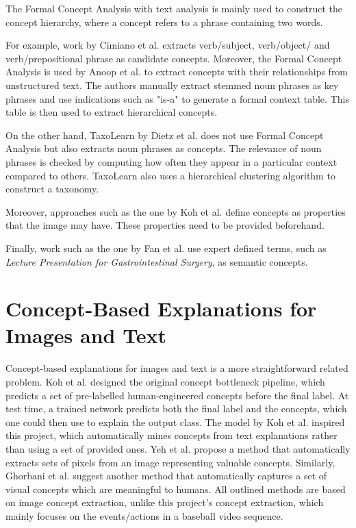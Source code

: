 The Formal Concept Analysis with text analysis is mainly used to construct the concept hierarchy, where a concept refers to a phrase containing two words.

For example, work by Cimiano et al. \cite{RefWorks:RefID:32-cimiano2005learning} extracts verb/subject, verb/object/ and verb/prepositional phrase as candidate concepts.
Moreover, the Formal Concept Analysis is used by Anoop et al. \cite{RefWorks:RefID:33-anoop2019extracting} to extract concepts with their relationships from unstructured text.
The authors manually extract stemmed noun phrases as key phrases and use indications such as "is-a" to generate a formal context table.
This table is then used to extract hierarchical concepts.

On the other hand, TaxoLearn \cite{RefWorks:RefID:34-dietz2012taxolearn} by Dietz et al. does not use Formal Concept Analysis but also extracts noun phrases as concepts. The relevance of noun phrases is checked by computing how often they appear in a particular context compared to others. TaxoLearn also uses a hierarchical clustering algorithm to construct a taxonomy.

Moreover, approaches such as the one by Koh et al. \cite{RefWorks:RefID:35-koh2020concept} define concepts as properties that the image may have. These properties need to be provided beforehand.

Finally, work such as the one by Fan et al. \cite{RefWorks:RefID:50-fan2004semantic} use expert defined terms, such as \emph{Lecture Presentation for Gastrointestinal Surgery}, as semantic concepts. 


\section{Concept-Based Explanations for Images and Text}

Concept-based explanations for images and text is a more straightforward related problem.
Koh et al. \cite{RefWorks:RefID:35-koh2020concept} designed the original concept bottleneck pipeline, which predicts a set of pre-labelled human-engineered concepts before the final label.
At test time, a trained network predicts both the final label and the concepts, which one could then use to explain the output class.
The model by Koh et al. inspired this project, which automatically mines concepts from text explanations rather than using a set of provided ones.
Yeh et al. \cite{RefWorks:RefID:36-yeh2019completeness-aware} propose a method that automatically extracts sets of pixels from an image representing valuable concepts.
Similarly, Ghorbani et al. \cite{RefWorks:RefID:37-ghorbani2019automatic} suggest another method that automatically captures a set of visual concepts which are meaningful to humans.
All outlined methods are based on image concept extraction, unlike this project's concept extraction, which mainly focuses on the events/actions in a baseball video sequence.


